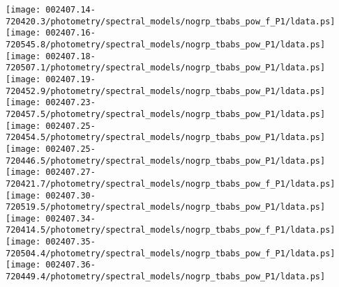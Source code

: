 \documentclass{aastex}
\begin{document}
\begin{figure*}[!ht]
\centering
\texttt{[image: 002407.14-720420.3/photometry/spectral\_models/nogrp\_tbabs\_pow\_f\_P1/ldata.ps]} \hfill 
\texttt{[image: 002407.16-720545.8/photometry/spectral\_models/nogrp\_tbabs\_pow\_P1/ldata.ps]} \hfill 
\texttt{[image: 002407.18-720507.1/photometry/spectral\_models/nogrp\_tbabs\_pow\_P1/ldata.ps]} \\ 
\vspace*{0.5in}
\texttt{[image: 002407.19-720452.9/photometry/spectral\_models/nogrp\_tbabs\_pow\_P1/ldata.ps]} \hfill 
\texttt{[image: 002407.23-720457.5/photometry/spectral\_models/nogrp\_tbabs\_pow\_P1/ldata.ps]} \hfill 
\texttt{[image: 002407.25-720454.5/photometry/spectral\_models/nogrp\_tbabs\_pow\_P1/ldata.ps]} \\ 
\vspace*{0.5in}
\texttt{[image: 002407.25-720446.5/photometry/spectral\_models/nogrp\_tbabs\_pow\_P1/ldata.ps]} \hfill 
\texttt{[image: 002407.27-720421.7/photometry/spectral\_models/nogrp\_tbabs\_pow\_f\_P1/ldata.ps]} \hfill 
\texttt{[image: 002407.30-720519.5/photometry/spectral\_models/nogrp\_tbabs\_pow\_P1/ldata.ps]} \\ 
\vspace*{0.5in}
\texttt{[image: 002407.34-720414.5/photometry/spectral\_models/nogrp\_tbabs\_pow\_f\_P1/ldata.ps]} \hfill 
\texttt{[image: 002407.35-720504.4/photometry/spectral\_models/nogrp\_tbabs\_pow\_f\_P1/ldata.ps]} \hfill 
\texttt{[image: 002407.36-720449.4/photometry/spectral\_models/nogrp\_tbabs\_pow\_P1/ldata.ps]} \\ 
\vspace*{0.5in}
\end{figure*}
\clearpage
\end{document}
